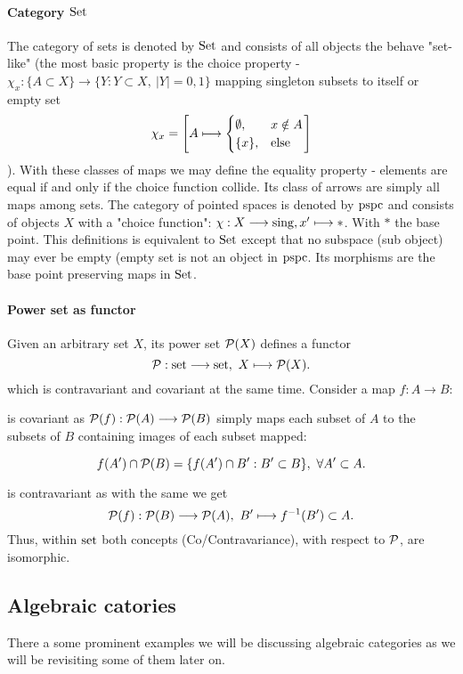 \paragraph{Category $\mathrm{Set}$}
The category of sets is denoted by $\mathrm{Set}$ and consists of all objects the behave "set-like" (the most basic property is the choice property - $\chi_{x} : \{A \subset X\} \longrightarrow \{Y: Y \subset X,\ |Y| = 0,1 \}$ mapping singleton subsets to itself or empty set
$$\chi_{x} = \left[A \longmapsto \begin{cases}
\emptyset, & x \notin A\\
\{x\},& \mathrm{else}\\\end{cases}\right]$$
). With these classes of maps we may define the equality property - elements are equal if and only if the choice function collide. Its class of arrows are simply all maps among sets.
The category of pointed spaces is denoted by $\mathrm{pspc}$ and consists of objects $X$ with a "choice function":
$ \chi : X \longrightarrow \mathrm{sing}, x' \longmapsto \ast$. With $\ast$ the base point. This definitions is equivalent to $\mathrm{Set}$ except that no subspace (sub object) may ever be empty (empty set is not an object in $\mathrm{pspc}$. Its morphisms are the base point preserving maps in $\mathrm{Set}$.

\paragraph{Power set as functor} Given an arbitrary set $X$, its power set $\mathcal{P}(X)$ defines a functor
$$\mathcal{P} : \mathrm{set} \longrightarrow \mathrm{set},\ X \longmapsto \mathcal{P}(X).$$
which is contravariant and covariant at the same time. Consider a map $f : A \longrightarrow B$:
\bn
\item is covariant as  $\mathcal{P}(f) : \mathcal{P}(A) \longrightarrow \mathcal{P}(B)$ simply maps each subset of $A$ to the subsets of $B$ containing images of each subset mapped:

$$f(A') \cap \mathcal{P}(B) = \{f(A') \cap B' : B' \subset B\},\ \forall A' \subset A.$$
\item is contravariant as with the same we get
$$\mathcal{P}(f) : \mathcal{P}(B) \longrightarrow \mathcal{P}(A),\ B' \longmapsto f^{-1}(B') \subset A.$$
\en
Thus, within $\mathrm{set}$ both concepts (Co/Contravariance), with respect to $\mathcal{P}$, are isomorphic.
\subsection{Algebraic catories}
There a some prominent examples we will be discussing algebraic categories as we will be revisiting some of them later on.

